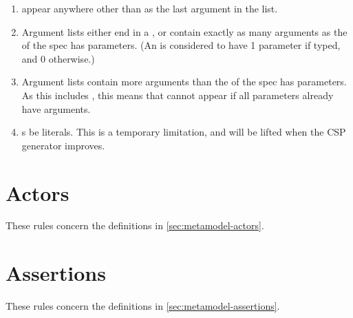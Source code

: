\begin{enumerate}
\item
	\mrestargument{} \rfcmustnot{} appear anywhere other than as the last
	argument in the list.
\item
	Argument lists \rfcmust{} either end in a \mrestargument, or
	contain exactly as many arguments as the \mmessagetopic{} of the spec
	has parameters.  (An \meventtopic{} is considered to have 1 parameter
	if typed, and 0 otherwise.)
\item
	Argument lists \rfcmustnot{} contain more
	arguments than the \mmessagetopic{} of the spec has parameters.
	As this includes \mrestargument, this means that \mrestargument{} cannot
	appear if all parameters already have arguments.
\item
	\mexpressionargument s \rfcshould{} be literals.  This is a temporary
	limitation, and will be lifted when the CSP generator improves.
\end{enumerate}

\section{Actors}\label{sec:wf-actors}

These rules concern the definitions in \cref{sec:metamodel-actors}.

\section{Assertions}\label{sec:wf-assertions}

These rules concern the definitions in \cref{sec:metamodel-assertions}.
